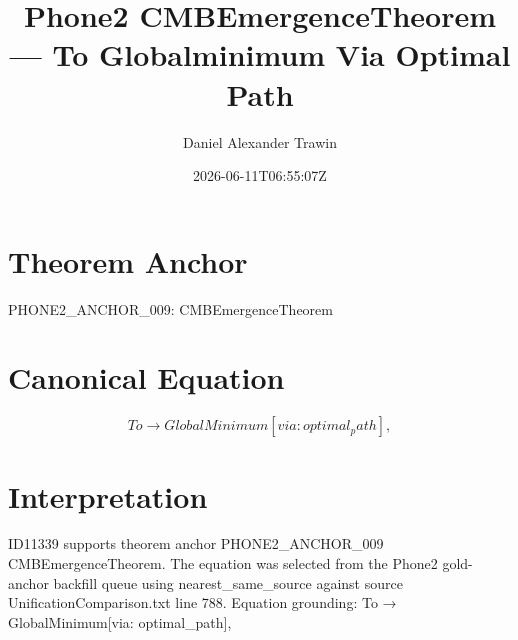 \documentclass[11pt]{article}
\title{Phone2 CMBEmergenceTheorem — To Globalminimum Via Optimal Path}
\author{Daniel Alexander Trawin}
\date{2026-06-11T06:55:07Z}
\begin{document}
\maketitle
\section*{Theorem Anchor}
PHONE2_ANCHOR_009: CMBEmergenceTheorem
\section*{Canonical Equation}
\[
To → GlobalMinimum[via: optimal_path],
\]
\section*{Interpretation}
ID11339 supports theorem anchor PHONE2_ANCHOR_009 CMBEmergenceTheorem. The equation was selected from the Phone2 gold-anchor backfill queue using nearest_same_source against source UnificationComparison.txt line 788. Equation grounding: To → GlobalMinimum[via: optimal_path],
\end{document}
